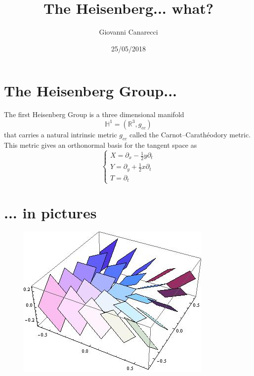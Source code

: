 \documentclass[serif]{beamer}
\title[The Heisenberg... what?] 
{The Heisenberg... what?}
\author%
{Giovanni Canarecci}
\institute[University of Helsinki] %
{
  Department of Mathematics and Statistics\\
  University of Helsinki
}
\date[25/05/2018] %
{25/05/2018}
\theoremstyle{definition}
\begin{document}
\begin{frame}
  \titlepage
\end{frame}




\section{The Heisenberg Group...}

\begin{frame}{}
The first Heisenberg Group is a three dimensional manifold
$$\mathbb{H}^1= ( \mathbb{R}^3, g_{cc} )$$
that carries a natural intrinsic metric $g_{cc}$ called the Carnot–Carathéodory metric.
\vspace{\baselineskip}
This metric gives an orthonormal basis for the tangent space as
 $$
\begin{cases}
X=\partial_x-\frac{1}{2}y\partial_t\\
Y=\partial_y+\frac{1}{2}x\partial_t\\
T=\partial_t
\end{cases}
 $$
\end{frame}


\section{... in pictures}
\begin{frame}{}
\begin{figure}
\centering
\includegraphics[width= 10 cm]{Distribution1.jpg}
\end{figure}
\end{frame}
\end{document}
